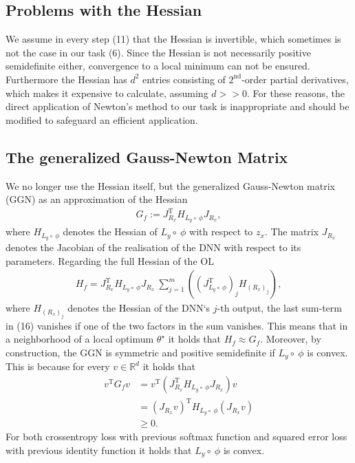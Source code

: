 \documentclass[conference]{IEEEtran}
\begin{document}
	
	\subsection{Problems with the Hessian}
	\noindent
	We assume in every step (11) that the Hessian is invertible, which sometimes is not the case in our task (6). Since the Hessian is not necessarily positive semidefinite either, convergence to a local minimum can not be ensured. Furthermore the Hessian has $d^{2}$ entries consisting of $2^{\text{nd}}$-order partial derivatives, which makes it expensive to calculate, assuming $d>>0$. For these reasons, the direct application of Newton's method to our task is inappropriate and should be modified to safeguard an efficient application.
	
	\subsection{The generalized Gauss-Newton Matrix}
	\noindent
	We no longer use the Hessian itself, but the generalized Gauss-Newton matrix (GGN) as an approximation of the Hessian
	\begin{align}
	G_{f} := J_{R_{x}}^{\mathrm{T}}H_{L_{y}\circ\:\phi}J_{R_{x}},
	\end{align}
	where $H_{L_{y}\circ\:\phi}$ denotes the Hessian of $L_{y}\circ\:\phi$ with respect to $z_{x}$. The matrix $J_{R_{x}}$ denotes the Jacobian of the realisation of the DNN with respect to its parameters.
	Regarding the full Hessian of the OL
	\begin{align}
	H_{f} = J_{R_{x}}^{\mathrm{T}}H_{L_{y}\circ\:\phi}J_{R_{x}}\:\sum_{j = 1}^{m}\left(\left(J_{L_{y}\circ \:\phi}^{\mathrm{T}}\right)_{j} H_{(R_{x})_{j}}\right),
	\end{align}
	where $H_{(R_{x})_{j}}$ denotes the Hessian of the DNN`s  $j$-th output, the last sum-term in (16) vanishes if one of the two factors in the sum vanishes.
	This means that in a neighborhood of a local optimum $\theta^{\star}$ it holds that $H_{f} \approx G_{f}$.   Moreover, by construction, the GGN is symmetric and positive semidefinite if $L_{y}\circ\:\phi$ is convex. This is because for every $v\in\mathbb{R}^{d}$ it holds that
	\begin{align}
	v^{\mathrm{T}}G_{f}v &= v^{\mathrm{T}}\left( J_{R_{x}}^{\mathrm{T}}H_{L_{y}\circ\:\phi}J_{R_{x}}\right)v\\
	&= \left(J_{R_{x}}v\right)^{\mathrm{T}}H_{L_{y}\circ\:\phi}\left(J_{R_{x}}v\right) \\
	&\geq 0.
	\end{align}
	For both crossentropy loss with previous softmax function and squared error loss with previous identity function it holds that $L_{y}\circ\:\phi$ is convex.
	
\end{document}
